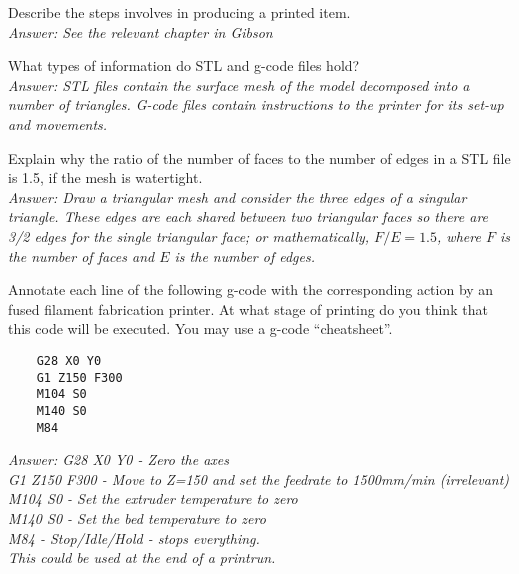 \documentclass{article}
\begin{document}
\begin{questions}
\item Describe the steps involves in producing a printed item. 
  \\[0.2cm] \emph{Answer: See the relevant chapter in Gibson}
\item What types of information do STL and g-code files hold? 
  \\[0.2cm] \emph{Answer: STL files contain the surface mesh of the model decomposed into a number of triangles. G-code files contain instructions to the printer for its set-up and movements. }
\item Explain why the ratio of the number of faces to the number of edges in a STL file is 1.5, if the mesh is watertight. 
  \\[0.2cm] \emph{Answer: Draw a triangular mesh and consider the three edges of a singular triangle. These edges are each shared between two triangular faces so there are 3/2 edges for the single triangular face; or mathematically, $F/E = 1.5$, where $F$ is the number of faces and $E$ is the number of edges.}
\item Annotate each line of the following g-code with the corresponding action by an fused filament fabrication printer. At what stage of printing do you think that this code will be executed. You may use a g-code ``cheatsheet''. 
\begin{verbatim}
	G28 X0 Y0  
	G1 Z150 F300
	M104 S0 
	M140 S0 
	M84 
\end{verbatim}
\emph{Answer: 
  	G28 X0 Y0  - Zero the axes\\
	G1 Z150 F300 - Move to Z=150 and set the feedrate to 1500mm/min (irrelevant)\\
	M104 S0 - Set the extruder temperature to zero\\
	M140 S0 - Set the bed temperature to zero\\
	M84 - Stop/Idle/Hold - stops everything. \\
This could be used at the end of a printrun.}
\end{questions}
\end{document}
